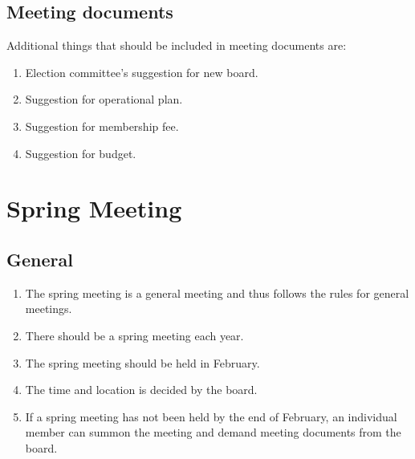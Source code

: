 \subsection{Meeting documents}
Additional things that should be included in meeting documents are:
\begin{enumerate}
  \item Election committee’s suggestion for new board.
  \item Suggestion for operational plan.
  \item Suggestion for membership fee.
  \item Suggestion for budget. 
\end{enumerate}

\section*{Spring Meeting}
\subsection{General}
\begin{enumerate}
  \item The spring meeting is a general meeting and thus follows the rules for general meetings.
  \item There should be a spring meeting each year.
  \item The spring meeting should be held in February.
  \item The time and location is decided by the board.
  \item If a spring meeting has not been held by the end of February, an individual member can summon the meeting and demand meeting documents from the board.
\end{enumerate}

